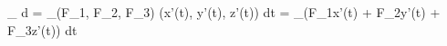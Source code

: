 \int_{\gamma} \cdot d =
\int_{\gamma}(F_1, F_2, F_3) \cdot (x'(t), y'(t), z'(t)) dt =
\int_{\gamma}(F_1x'(t) + F_2y'(t) + F_3z'(t)) dt